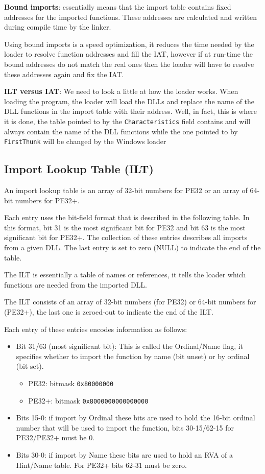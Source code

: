{\bf Bound imports}: essentially means that the import table contains fixed addresses for the imported functions. These addresses are calculated and written during compile time by the linker.

Using bound imports is a speed optimization, it reduces the time needed by the loader to resolve function addresses and fill the IAT, however if at run-time the bound addresses do not match the real ones then the loader will have to resolve these addresses again and fix the IAT.


{\bf ILT versus IAT}: We need to look a little at how the loader works. When loading the program, the loader will load the DLLs and replace the name of the DLL functions in the import table
with their address. Well, in fact, this is where it is done, the table pointed to by the \verb+Characteristics+ field contains and will always contain the name of the DLL functions while the one pointed to by \verb+FirstThunk+ will be changed by the Windows loader


\subsection{Import Lookup Table (ILT)}

An import lookup table is an array of 32-bit numbers for PE32 or an array of 64-bit numbers for PE32+.

Each entry uses the bit-field format that is described in the following table. In this format, bit 31 is the most significant bit for PE32 and bit 63 is the most significant bit for PE32+. The collection of these entries describes all imports from a given DLL. The last entry is set to zero (NULL) to indicate the end of the table.

The ILT is essentially a table of names or references, it tells the loader which functions are needed from the imported DLL.

The ILT consists of an array of 32-bit numbers (for PE32) or 64-bit numbers for (PE32+), the last one is zeroed-out to indicate the end of the ILT.

Each entry of these entries encodes information as follows:
\begin{itemize}
    \item Bit 31/63 (most significant bit): This is called the Ordinal/Name flag, it specifies whether to import the function by name (bit unset) or by ordinal (bit set).
    \begin{itemize}
        \item PE32: bitmask \verb+0x80000000+
        \item PE32+: bitmask \verb+0x8000000000000000+
    \end{itemize}
    \item Bits 15-0: if import by Ordinal these bits are used to hold the 16-bit ordinal number that will be used to import the function, bits 30-15/62-15 for PE32/PE32+ must be 0.
    \item Bits 30-0: if import by Name these bits are used to hold an RVA of a Hint/Name table. For PE32+ bits 62-31 must be zero. 
\end{itemize}


